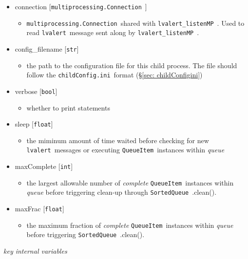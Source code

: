 \documentclass{article}
\newcommand{\multiprocessingConnection}{\texttt{multiprocessing.Connection}~}
\newcommand{\alert}{\texttt{lvalert}~}
\newcommand{\lvalertListenMP}{\texttt{lvalert\_listenMP}~}
\newcommand{\SortedQueue}{\texttt{SortedQueue}~}
\newcommand{\QueueItem}{\texttt{QueueItem}~}
\newcommand{\childConfigini}{\texttt{childConfig.ini}~}
\begin{document}
\begin{itemize}
    \item{connection [\multiprocessingConnection]
        \begin{itemize}
            \item{\multiprocessingConnection shared with \lvalertListenMP. Used to read \alert message sent along by \lvalertListenMP.}
        \end{itemize}
         }
    \item{config\_filename [\texttt{str}]
        \begin{itemize}
            \item{the path to the configuration file for this child process. The file should follow the \childConfigini format (\S\ref{sec: childConfigini})}
        \end{itemize}
         }
    \item{verbose [\texttt{bool}]
        \begin{itemize}
            \item{whether to print statements}
        \end{itemize}
         }
    \item{sleep [\texttt{float}]
        \begin{itemize}
            \item{the miminum amount of time waited before checking for new \alert messages or executing \QueueItem instances within \textit{queue}}
        \end{itemize}
         }
    \item{maxComplete [\texttt{int}]
        \begin{itemize}
            \item{the largest allowable number of \textit{complete} \QueueItem instances within \textit{queue} before triggering clean-up through \SortedQueue.clean().}
        \end{itemize}
         }
    \item{maxFrac [\texttt{float}]
        \begin{itemize}
            \item{the maximum fraction of \textit{complete} \QueueItem instances within \textit{queue} before triggering \SortedQueue.clean().}
        \end{itemize}
         }
\end{itemize}

\noindent
\textit{key internal variables}
\end{document}
